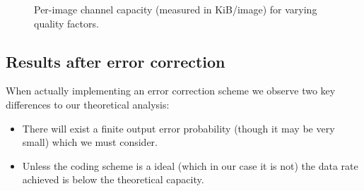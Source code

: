 \begin{figure}[tbp]
  \begin{center}
    \caption{Per-image channel capacity (measured in KiB/image) for varying quality factors.}
    \label{graph:capacity}
  \end{center}
\end{figure}

\subsection{Results after error correction}

When actually implementing an error correction scheme we observe two key differences to our theoretical analysis:
\begin{itemize}
    \item There will exist a finite output error probability (though it may be very small) which we must consider.
    \item Unless the coding scheme is a ideal (which in our case it is not) the data rate achieved is below the theoretical capacity.
\end{itemize}


